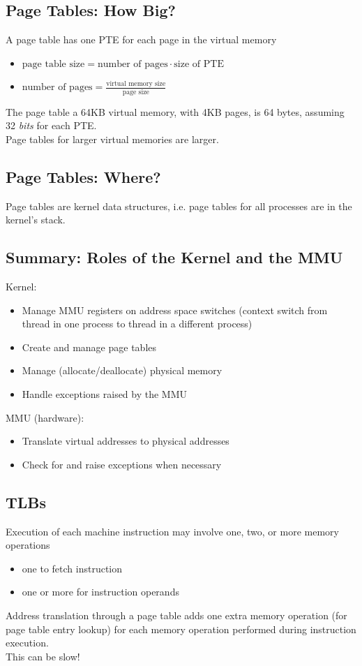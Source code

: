 \documentclass[12pt]{article}
\theoremstyle{plain}
\theoremstyle{definition}
\begin{document}
\subsection{Page Tables: How Big?}
A page table has one PTE for each page in the virtual memory
\begin{itemize}
  \item $\text{page table size} = \text{number of pages} \cdot \text{size of PTE}$
  \item $\text{number of pages} = \frac{\text{virtual memory size}}{\text{page size}}$
\end{itemize}
The page table a 64KB virtual memory, with 4KB pages, is 64 bytes, assuming 32 \emph{bits} for each PTE. \\
Page tables for larger virtual memories are larger.

\subsection{Page Tables: Where?}
Page tables are kernel data structures, i.e. page tables for all processes are in the kernel's stack.

\subsection{Summary: Roles of the Kernel and the MMU}
Kernel:
\begin{itemize}
  \item Manage MMU registers on address space switches (context switch from thread in one process to thread in a different process)
  \item Create and manage page tables
  \item Manage (allocate/deallocate) physical memory
  \item Handle exceptions raised by the MMU
\end{itemize}
MMU (hardware):
\begin{itemize}
  \item Translate virtual addresses to physical addresses
  \item Check for and raise exceptions when necessary
\end{itemize}

\subsection{TLBs}
Execution of each machine instruction may involve one, two, or more memory operations
\begin{itemize}
  \item one to fetch instruction
  \item one or more for instruction operands
\end{itemize}
Address translation through a page table adds one extra memory operation (for page table entry lookup) for each memory operation performed during instruction execution. \\
This can be slow! \\
\end{document}
